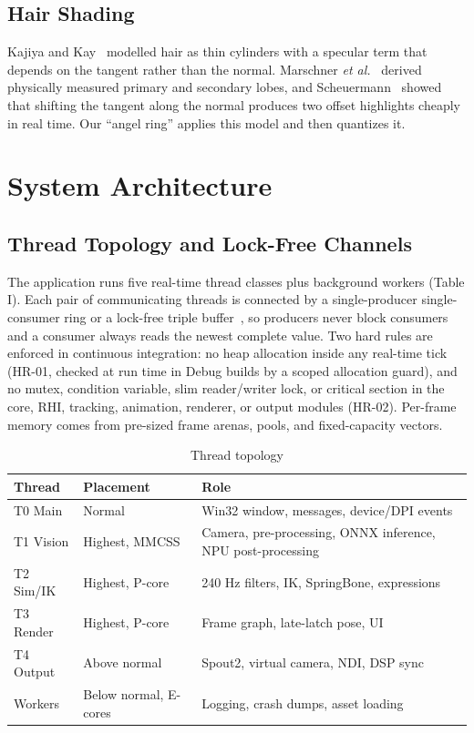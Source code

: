 \documentclass[conference]{IEEEtran}
\begin{document}
\subsection{Hair Shading}
Kajiya and Kay~\cite{kajiyakay} modelled hair as thin cylinders with a specular term that depends on the tangent rather than the normal. Marschner \textit{et al.}~\cite{marschner} derived physically measured primary and secondary lobes, and Scheuermann~\cite{scheuermann} showed that shifting the tangent along the normal produces two offset highlights cheaply in real time. Our ``angel ring'' applies this model and then quantizes it.


\section{System Architecture}

\subsection{Thread Topology and Lock-Free Channels}
The application runs five real-time thread classes plus background workers (Table I). Each pair of communicating threads is connected by a single-producer single-consumer ring or a lock-free triple buffer~\cite{herlihy}, so producers never block consumers and a consumer always reads the newest complete value. Two hard rules are enforced in continuous integration: no heap allocation inside any real-time tick (HR-01, checked at run time in Debug builds by a scoped allocation guard), and no mutex, condition variable, slim reader/writer lock, or critical section in the core, RHI, tracking, animation, renderer, or output modules (HR-02). Per-frame memory comes from pre-sized frame arenas, pools, and fixed-capacity vectors.

\begin{table}[!t]
\renewcommand{\arraystretch}{1.15}
\caption{Thread topology}
\label{tab:threads}
\centering\footnotesize
\begin{tabular}{p{}p{}p{}}
\hline
\textbf{Thread} & \textbf{Placement} & \textbf{Role} \\
\hline
T0 Main & Normal & Win32 window, messages, device/DPI events \\
T1 Vision & Highest, MMCSS & Camera, pre-processing, ONNX inference, NPU post-processing \\
T2 Sim/IK & Highest, P-core & 240 Hz filters, IK, SpringBone, expressions \\
T3 Render & Highest, P-core & Frame graph, late-latch pose, UI \\
T4 Output & Above normal & Spout2, virtual camera, NDI, DSP sync \\
Workers & Below normal, E-cores & Logging, crash dumps, asset loading \\
\hline
\end{tabular}
\end{table}
\end{document}
